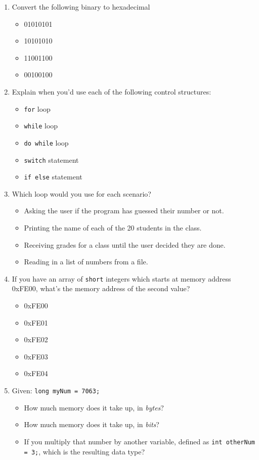 \documentclass[letter,11pt]{article}
\begin{document}
\begin{enumerate}
    \item Convert the following binary to hexadecimal
    \begin{itemize}
        \item 01010101
        \item 10101010
        \item 11001100
        \item 00100100
    \end{itemize}
    
    \item Explain when you'd use each of the following control structures:
    \begin{itemize}
        \item \texttt{for} loop
        \item \texttt{while} loop
        \item \texttt{do while} loop
        \item \texttt{switch} statement
        \item \texttt{if else} statement
    \end{itemize}
    
    \item Which loop would you use for each scenario?
    \begin{itemize}
        \item Asking the user if the program has guessed their number or not.
        \item Printing the name of each of the 20 students in the class.
        \item Receiving grades for a class until the user decided they are done.
        \item Reading in a list of numbers from a file.
    \end{itemize}
    
    \item If you have an array of \texttt{short} integers which starts at memory address 0xFE00, what's the memory address of the second value?
    \begin{itemize}
        \item 0xFE00
        \item 0xFE01
        \item 0xFE02
        \item 0xFE03
        \item 0xFE04
    \end{itemize}
    
    \item Given: \texttt{long myNum = 7063;}
    \begin{itemize}
        \item How much memory does it take up, in \textit{bytes}?
        \item How much memory does it take up, in \textit{bits}?
        \item If you multiply that number by another variable, defined as \texttt{int otherNum = 3;}, which is the resulting data type?
    \end{itemize}
    

\end{enumerate}
\end{document}
